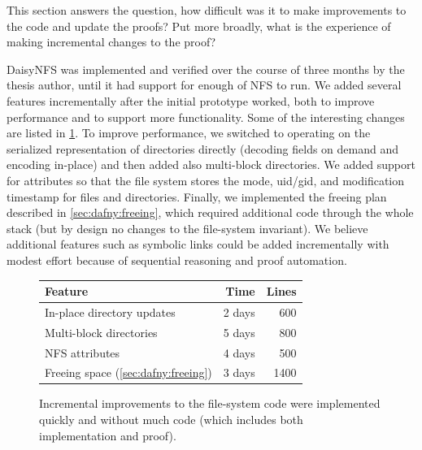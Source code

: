This section answers the question, how difficult was it to make improvements to
the code and update the proofs? Put more broadly, what is the experience of
making incremental changes to the proof?

DaisyNFS was implemented and verified over the course of three months by the
thesis author, until it had support for enough of NFS to run. We
added several features incrementally after the initial prototype
worked, both to improve performance and to support more
functionality. Some of the interesting changes are listed in
\cref{fig:features}.  To improve performance, we switched to
operating on the serialized representation of directories directly
(decoding fields on demand and encoding in-place) and then added also
multi-block directories.  We added support for attributes so that the file
system stores the mode, uid/gid, and modification timestamp for files and directories.
Finally, we implemented the freeing plan described
in \cref{sec:dafny:freeing}, which required additional code through the
whole stack (but by design no changes to the file-system invariant).
We believe additional features such as symbolic links
could be added incrementally with modest effort because
of sequential reasoning and proof automation.

\begin{figure}[ht!]
\begin{center}
\begin{tabular}{lrr}
  \toprule
  \textbf{Feature} & \textbf{Time} & \textbf{Lines} \\
  \midrule
  In-place directory updates & 2 days & 600\\
  Multi-block directories & 5 days & 800 \\
  NFS attributes & 4 days & 500 \\
  Freeing space (\cref{sec:dafny:freeing}) & 3 days & 1400\\
  \bottomrule
\end{tabular}
\end{center}
\caption[Effort for incremental improvements to the file system]%
{Incremental improvements to the file-system code were implemented
  quickly and without much code (which includes both implementation and proof).}
\label{fig:features}
\end{figure}

